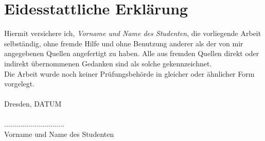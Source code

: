 
\chapter*{Eidesstattliche Erklärung}\thispagestyle{fancy}\markboth{}{}

Hiermit versichere ich, \textit{Vorname und Name des Studenten}, die vorliegende Arbeit selbständig, ohne fremde Hilfe und ohne Benutzung anderer als der von mir angegebenen Quellen angefertigt zu haben. Alle aus fremden Quellen direkt oder indirekt übernommenen Gedanken sind als solche gekennzeichnet. \\
Die Arbeit wurde noch keiner Prüfungsbehörde in gleicher oder ähnlicher Form vorgelegt.\\
\\
Dresden, DATUM\\
\\

..............................\\
Vorname und Name des Studenten
